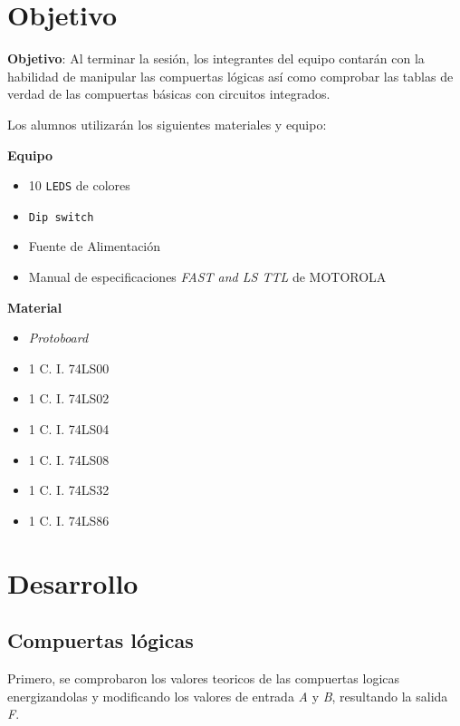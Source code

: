 \documentclass[a4paper,12pt]{article}
\begin{document}
\newpage

\tableofcontents

\newpage


\section*{Objetivo}

\textbf{Objetivo}: Al terminar la sesión, los integrantes del equipo contarán con la habilidad de manipular las
compuertas lógicas así como comprobar las tablas de verdad de las compuertas básicas con circuitos integrados.\par

Los alumnos utilizarán los siguientes materiales y equipo:
\vspace{-0.4cm}
\begin{multicols}{2}
\textbf{Equipo}\\
\begin{itemize}[nosep]
		\item 10 \texttt{LEDS} de colores
		\item \texttt{Dip switch}
		\item Fuente de Alimentación
		\item Manual de especificaciones \textit{FAST and LS TTL} de MOTOROLA\textregistered
\end{itemize}

\columnbreak

\textbf{Material}\\
\begin{itemize}[nosep]
		\item \textit{Protoboard}
		\item 1 C. I. 74LS00
		\item 1 C. I. 74LS02
		\item 1 C. I. 74LS04
		\item 1 C. I. 74LS08
		\item 1 C. I. 74LS32
		\item 1 C. I. 74LS86
	
\end{itemize}

\end{multicols}

\section{Desarrollo}

\subsection{Compuertas lógicas}
Primero, se comprobaron los valores teoricos de las compuertas logicas energizandolas y modificando los valores de entrada \emph{A} y \emph{B}, resultando la salida \emph{F}.\par
\end{document}
